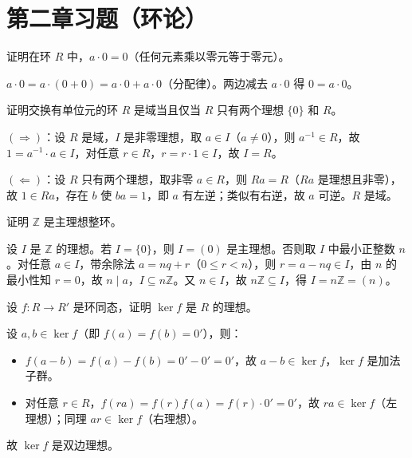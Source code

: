 \section{第二章习题（环论）}

\begin{homework}
证明在环 $R$ 中，$a \cdot 0 = 0$（任何元素乘以零元等于零元）。

\begin{solution}
$a \cdot 0 = a \cdot (0 + 0) = a \cdot 0 + a \cdot 0$（分配律）。两边减去 $a \cdot 0$ 得 $0 = a \cdot 0$。
\end{solution}
\end{homework}

\begin{homework}
证明交换有单位元的环 $R$ 是域当且仅当 $R$ 只有两个理想 $\{0\}$ 和 $R$。

\begin{solution}
$(\Rightarrow)$：设 $R$ 是域，$I$ 是非零理想，取 $a \in I$（$a \ne 0$），则 $a^{-1} \in R$，故 $1 = a^{-1} \cdot a \in I$，对任意 $r \in R$，$r = r \cdot 1 \in I$，故 $I = R$。

$(\Leftarrow)$：设 $R$ 只有两个理想，取非零 $a \in R$，则 $Ra = R$（$Ra$ 是理想且非零），故 $1 \in Ra$，存在 $b$ 使 $ba = 1$，即 $a$ 有左逆；类似有右逆，故 $a$ 可逆。$R$ 是域。
\end{solution}
\end{homework}

\begin{homework}
证明 $\mathbb{Z}$ 是主理想整环。

\begin{solution}
设 $I$ 是 $\mathbb{Z}$ 的理想。若 $I = \{0\}$，则 $I = (0)$ 是主理想。否则取 $I$ 中最小正整数 $n$。对任意 $a \in I$，带余除法 $a = nq + r$（$0 \le r < n$），则 $r = a - nq \in I$，由 $n$ 的最小性知 $r = 0$，故 $n \mid a$，$I \subseteq n\mathbb{Z}$。又 $n \in I$，故 $n\mathbb{Z} \subseteq I$，得 $I = n\mathbb{Z} = (n)$。
\end{solution}
\end{homework}

\begin{homework}
设 $f \colon R \to R'$ 是环同态，证明 $\ker f$ 是 $R$ 的理想。

\begin{solution}
设 $a, b \in \ker f$（即 $f(a) = f(b) = 0'$），则：
\begin{itemize}
  \item $f(a - b) = f(a) - f(b) = 0' - 0' = 0'$，故 $a - b \in \ker f$，$\ker f$ 是加法子群。
  \item 对任意 $r \in R$，$f(ra) = f(r) f(a) = f(r) \cdot 0' = 0'$，故 $ra \in \ker f$（左理想）；同理 $ar \in \ker f$（右理想）。
\end{itemize}
故 $\ker f$ 是双边理想。
\end{solution}
\end{homework}

